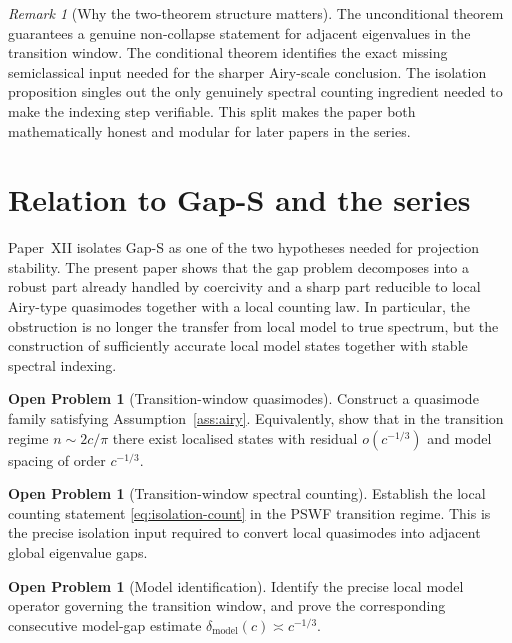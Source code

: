 \documentclass[12pt,a4paper]{amsart}
\theoremstyle{definition}
\newtheorem{problem}[theorem]{Open Problem}
\theoremstyle{remark}
\newtheorem{remark}[theorem]{Remark}
\begin{document}
\begin{remark}[Why the two-theorem structure matters]
The unconditional theorem guarantees a genuine non-collapse statement for
adjacent eigenvalues in the transition window.
The conditional theorem identifies the exact missing semiclassical input
needed for the sharper Airy-scale conclusion.
The isolation proposition singles out the only genuinely spectral
counting ingredient needed to make the indexing step verifiable.
This split makes the paper both mathematically honest and modular for later
papers in the series.
\end{remark}

\section{Relation to Gap-S and the series}
\label{sec:series}

Paper~XII isolates Gap-S as one of the two hypotheses needed for projection
stability.
The present paper shows that the gap problem decomposes into a robust part
already handled by coercivity and a sharp part reducible to local Airy-type
quasimodes together with a local counting law.
In particular, the obstruction is no longer the transfer from local model to
true spectrum, but the construction of sufficiently accurate local model
states together with stable spectral indexing.

\begin{problem}[Transition-window quasimodes]
\label{prob:quasimodes}
Construct a quasimode family satisfying Assumption~\ref{ass:airy}.
Equivalently, show that in the transition regime $n\sim 2c/\pi$ there exist
localised states with residual $o(c^{-1/3})$ and model spacing of order
$c^{-1/3}$.
\end{problem}

\begin{problem}[Transition-window spectral counting]
\label{prob:index}
Establish the local counting statement \eqref{eq:isolation-count} in the
PSWF transition regime.
This is the precise isolation input required to convert local quasimodes into
adjacent global eigenvalue gaps.
\end{problem}

\begin{problem}[Model identification]
\label{prob:model}
Identify the precise local model operator governing the transition window,
and prove the corresponding consecutive model-gap estimate
$\delta_{\mathrm{model}}(c)\asymp c^{-1/3}$.
\end{problem}
\end{document}
